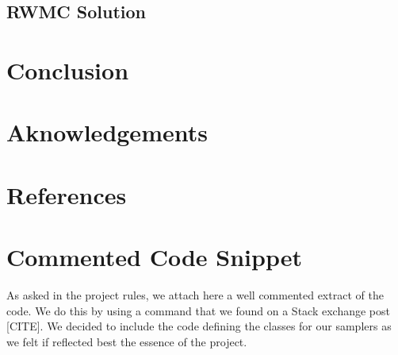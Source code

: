 \documentclass[a4paper, 12pt,oneside]{article}
\begin{document}
		\subsection{RWMC Solution}
	\section{Conclusion}
	\section*{Aknowledgements}
	\section*{References}
	\appendix
		\section{Commented Code Snippet}\label{appendix:commented-code-snippet}
		As asked in the project rules, we attach here a well commented extract of the code. We do this by using a command that we found on a Stack exchange post [CITE]. We decided to include the code defining the classes for our samplers as we felt if reflected best the essence of the project.
\end{document}
